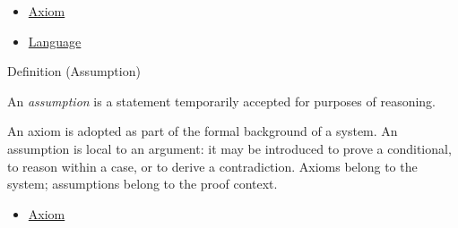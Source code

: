 \begin{dependencies}
\begin{itemize}
  \item \hyperref[def:axiom]{Axiom}
  \item \hyperref[def:language]{Language}
\end{itemize}
\end{dependencies}

\begin{definitionbox}{Definition (Assumption)}
\begin{definition}[Assumption]
\label{def:assumption}
An \emph{assumption} is a statement temporarily accepted for purposes of
reasoning.
\end{definition}
\end{definitionbox}

\begin{remark*}[Interpretation]
An axiom is adopted as part of the formal background of a system. An
assumption is local to an argument: it may be introduced to prove a conditional,
to reason within a case, or to derive a contradiction. Axioms belong to the
system; assumptions belong to the proof context.
\end{remark*}

\begin{dependencies}
\begin{itemize}
  \item \hyperref[def:axiom]{Axiom}
\end{itemize}
\end{dependencies}
